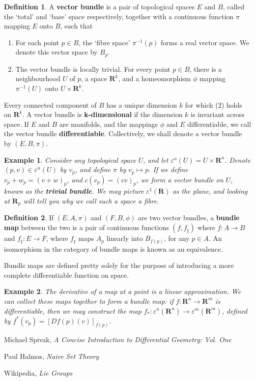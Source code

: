 \documentclass[12pt]{report}
\theoremstyle{plain}
\newtheorem*{example}{Example}
\theoremstyle{definition}
\newtheorem*{defi}{Definition}
\newenvironment{definition}
    {\begin{samepage}\begin{framed}\begin{defi}}
    {\end{defi}\end{framed}\end{samepage}}
\begin{document}
\begin{definition}
    A {\bf vector bundle} is a pair of topological spaces $E$ and $B$, called the `total' and `base' space respectively, together with a continuous function $\pi$ mapping $E$ onto $B$, such that
    \begin{enumerate}
        \item[(1)] For each point $p \in B$, the `fibre space' $\pi^{-1}(p)$ forms a real vector space. We denote this vector space by $B_p$.
        \item[(2)] The vector bundle is locally trivial. For every point $p \in B$, there is a neighbourhood $U$ of $p$, a space $\mathbf{R}^k$, and a homeomorphism $\phi$ mapping $\pi^{-1}(U)$ onto $U \times \mathbf{R}^k$.
    \end{enumerate}
    Every connected component of $B$ has a unique dimension $k$ for which (2) holds on $\mathbf{R}^k$. A vector bundle is {\bf k-dimensional} if the dimension $k$ is invariant across space. If $E$ and $B$ are manifolds, and the mappings $\phi$ and $E$ differentiable, we call the vector bundle {\bf differentiable}. Collectively, we shall denote a vector bundle by $(E,B,\pi)$.
\end{definition}

\begin{example}
    Consider any topological space $U$, and let $\varepsilon^n(U) = U \times \mathbf{R}^n$. Denote $(p,v) \in \varepsilon^n(U)$ by $v_p$, and define $\pi$ by $v_p \mapsto p$. If we define $v_p + w_p = (v + w)_p$, and $c(v_p) = (cv)_p$, we form a vector bundle on $U$, known as the {\bf trivial bundle}. We may picture $\varepsilon^1(\mathbf{R})$ as the plane, and looking at $\mathbf{R}_p$ will tell you why we call such a space a fibre.
\end{example}

\begin{definition}
    If $(E,A,\pi)$ and $(F,B,\phi)$ are two vector bundles, a {\bf bundle map} between the two is a pair of continuous functions $(f,f_\sharp)$ where $f:A \to B$ and $f_\sharp:E \to F$, where $f_\sharp$ maps $A_p$ linearly into $B_{f(p)}$, for any $p \in A$. An isomorphism in the category of bundle maps is known as an equivalence.
\end{definition}

Bundle maps are defined pretty solely for the purpose of introducing a more complete differentiable function on space.

\begin{example}
    The derivative of a map at a point is a linear approximation. We can collect these maps together to form a bundle map: if $f:\mathbf{R}^n \to \mathbf{R}^m$ is differentiable, then we may construct the map $f_*:\varepsilon^n(\mathbf{R}^n) \to \varepsilon^m(\mathbf{R}^m)$, defined by $f^*(v_p) = [Df(p)(v)]_{f(p)}$.
\end{example}

\begin{thebibliography}{10}
     Michael Spivak,
    \emph{A Concise Introduction to Differential Geometry: Vol. One}

     Paul Halmos,
    \emph{Naive Set Theory}

     Wikipedia,
    \emph{Lie Groups}
\end{thebibliography}
\end{document}
